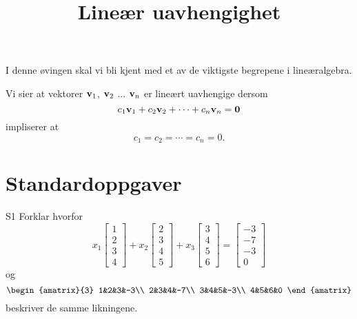

\title{Lineær uavhengighet}



\maketitle

I denne øvingen skal vi bli kjent med et av de viktigste begrepene i lineæralgebra.

\begin{tcolorbox}
Vi sier at vektorer $\mathbf{v}_1$, $\mathbf{v}_2$ ... $\mathbf{v}_n$ er lineært uavhengige dersom
\[
c_1\mathbf{v}_1+c_2\mathbf{v}_2 +\cdots +c_n\mathbf{v}_n=\mathbf{0}
\]
impliserer 
at
\[
c_1=c_2=\cdots=c_n= 0.
\]
\end{tcolorbox}



\section*{Standardoppgaver}

\begin{oppgave}{S1}
Forklar hvorfor 
\[
x_1
\begin{bmatrix}
1\\
2\\
3\\
4
\end{bmatrix}
+
x_2
\begin{bmatrix}
2\\
3\\
4\\
5
\end{bmatrix}
+
x_3
\begin{bmatrix}
3\\
4\\
5\\
6
\end{bmatrix}
=
\begin{bmatrix}
-3\\
-7\\
-3\\
0
\end{bmatrix}
\]
og 
\[
\begin{amatrix}{3}
1&2&3&-3\\
2&3&4&-7\\
3&4&5&-3\\
4&5&6&0
\end{amatrix}
\]
beskriver de samme likningene.
\end{oppgave}


